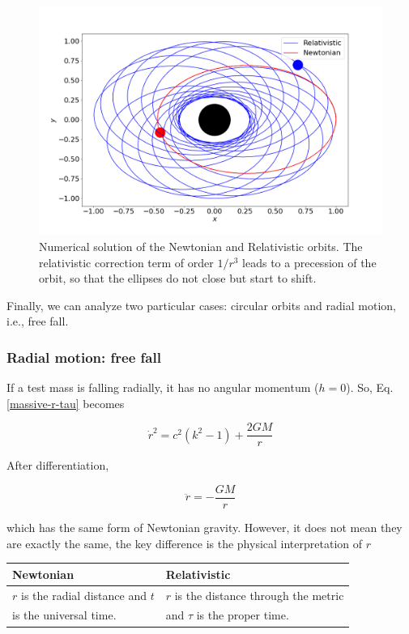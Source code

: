 \documentclass[letterpaper,11pt,onecolumn]{article}
\begin{document}
\begin{figure}[h!]
    \centering
    \includegraphics[width=0.8\linewidth]{Presentations/Images/2_class_rel_orbit.png}
    \caption{Numerical solution of the Newtonian and Relativistic orbits. The relativistic correction term of order $1/r^{3}$ leads to a precession of the orbit, so that the ellipses do not close but start to shift.}
    \label{fig:relnew}
\end{figure}


Finally, we can analyze two particular cases: circular orbits and radial motion, i.e., free fall. 

\subsubsection{Radial motion: free fall}

If a test mass is falling radially, it has no angular momentum ($h=0$). So, Eq. \ref{massive-r-tau} becomes 

\begin{equation} \label{massive-radialcase-main}
    \dot{r}^2 = c^2(k^2-1) + \frac{2GM}{r}
\end{equation}

After differentiation, 

\begin{equation*}
    \ddot{r} = - \frac{GM}{r}
\end{equation*}

which has the same form of Newtonian gravity. However, it does not mean they are exactly the same, the key difference is the physical interpretation of $r$

\begin{table}[h!]
    \centering
    \begin{tabular}{l|l}
         Newtonian & Relativistic  \\ \hline
         $r$ is the radial distance and $t$ & $r$ is the distance through the metric \\
         is the universal time. & and $\tau$ is the proper time. 
    \end{tabular}
\end{table}
\end{document}
